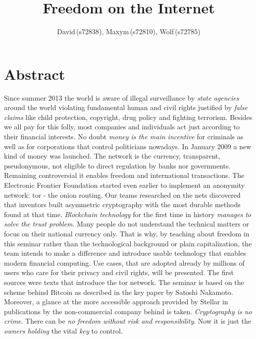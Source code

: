 \documentclass[english, DIV=calc, BCOR=5mm, fontsize=11pt, portrait]{scrartcl}	 %
\title{Freedom on the Internet} %
\author{David\,(s72838), Maxym\,(s72810), Wolf\,(s72785) } %
\date{} %
\newcommand{\initial}[1]{ %
\lettrine[lines=3,lhang=0.3,nindent=0em]{
\color{DarkGoldenrod}
{\textsf{#1}}}{}}
\begin{document}

\maketitle

\tableofcontents

\newpage
	
\section{Abstract}%


\begin{onehalfspace}

\initial{S}ince summer 2013 the world is aware of illegal surveillance by \textit{state agencies} around the world violating fundamental human and civil rights justified by \textit{false claims} like child protection, copyright, drug policy and fighting terrorism.
Besides we all pay for this folly, most companies and individuals act just according to their financial interests.
No doubt \textit{money is the main incentive} for criminals as well as for corporations that control politicians nowadays.
In January 2009 a new kind of money was launched.
The network is the currency, transparent, pseudonymous, not eligible to direct regulation by banks nor governments. Remaining controversial it enables freedom and international transactions.
The Electronic Frontier Foundation started even earlier to implement an anonymity network: tor - the onion routing.
Our teams researched on the nets discovered that inventors built asymmetric cryptography with the most durable methods found at that time.
\textit{Blockchain technology} for the first time in history \textit{manages to solve the trust problem}.
Many people do not understand the technical matters or focus on their national currency only. That is why, by teaching about freedom in this seminar rather than the technological background or plain capitalization, the team intends to make a difference and introduce usable technology that enables modern financial computing.
Use cases, that are adopted already by millions of users who care for their privacy and civil rights, will be presented.
The first sources were texts that introduce the tor network.
The seminar is based on the scheme behind Bitcoin as described in the key paper by Satoshi Nakamoto. Moreover, a glance at the more accessible approach provided by Stellar in publications by the non-commercial company behind is taken.
\textit{Cryptography is no crime}. There can be \textit{no freedom without risk and responsibility}.
Now it is just the \textit{owners holding} the vital \textit{key} to control.
\end{onehalfspace}
\end{document}

